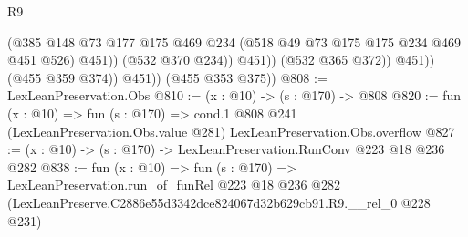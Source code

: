\begin{lexlean}{R9}
\begin{coremodule}
                          (@385
                            @148
                            @73
                            @177
                            @175
                            @469
                            @234
                            (@518 @49 @73 @175 @175 @234 @469 @451 @526)
                            @451))
                        (@532 @370 @234))
                      @451))
                  (@532 @365 @372))
                @451))
            (@455 @359 @374))
          @451))
      (@455 @353 @375))
@808 := LexLeanPreservation.Obs
@810 := (x : @10) -> (s : @170) -> @808
@820 := fun (x : @10) =>
  fun (s : @170) =>
  cond.{1} @808 @241 (LexLeanPreservation.Obs.value @281) LexLeanPreservation.Obs.overflow
@827 := (x : @10) -> (s : @170) -> LexLeanPreservation.RunConv @223 @18 @236 @282
@838 := fun (x : @10) =>
  fun (s : @170) =>
  LexLeanPreservation.run_of_funRel
    @223
    @18
    @236
    @282
    (LexLeanPreserve.C2886e55d3342dce824067d32b629cb91.R9.__rel_0 @228 @231)
\end{coremodule}
\end{lexlean}
